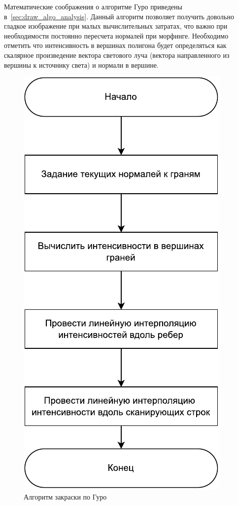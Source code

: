 Математические соображения о алгоритме Гуро приведены в~\ref{sec:draw_algo_analysis}.
Данный алгоритм позволяет получить довольно гладкое изображение при малых вычислительных затратах, что важно при необходимости постоянно пересчета нормалей при морфинге.
Необходимо отметить что интенсивность в вершинах полигона будет определяться как скалярное произведение вектора светового луча (вектора направленного из вершины к источнику света) и нормали в вершине.
\begin{figure}[h]
	\centering
	\includegraphics{images/guro_morph.pdf}
	\caption{Алгоритм закраски по Гуро}
	\label{fig:guro_algo}
\end{figure}

